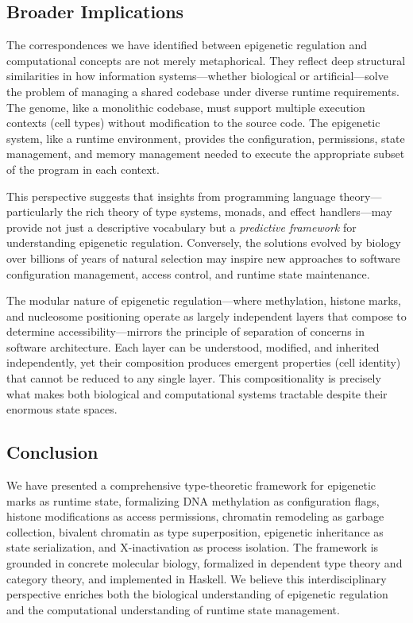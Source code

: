 \documentclass[12pt,a4paper]{article}
\begin{document}
\subsection{Broader Implications}

The correspondences we have identified between epigenetic regulation and computational concepts are not merely metaphorical. They reflect deep structural similarities in how information systems---whether biological or artificial---solve the problem of managing a shared codebase under diverse runtime requirements. The genome, like a monolithic codebase, must support multiple execution contexts (cell types) without modification to the source code. The epigenetic system, like a runtime environment, provides the configuration, permissions, state management, and memory management needed to execute the appropriate subset of the program in each context.

This perspective suggests that insights from programming language theory---particularly the rich theory of type systems, monads, and effect handlers---may provide not just a descriptive vocabulary but a \emph{predictive framework} for understanding epigenetic regulation. Conversely, the solutions evolved by biology over billions of years of natural selection may inspire new approaches to software configuration management, access control, and runtime state maintenance.

The modular nature of epigenetic regulation---where methylation, histone marks, and nucleosome positioning operate as largely independent layers that compose to determine accessibility---mirrors the principle of separation of concerns in software architecture. Each layer can be understood, modified, and inherited independently, yet their composition produces emergent properties (cell identity) that cannot be reduced to any single layer. This compositionality is precisely what makes both biological and computational systems tractable despite their enormous state spaces.

\subsection{Conclusion}

We have presented a comprehensive type-theoretic framework for epigenetic marks as runtime state, formalizing DNA methylation as configuration flags, histone modifications as access permissions, chromatin remodeling as garbage collection, bivalent chromatin as type superposition, epigenetic inheritance as state serialization, and X-inactivation as process isolation. The framework is grounded in concrete molecular biology, formalized in dependent type theory and category theory, and implemented in Haskell. We believe this interdisciplinary perspective enriches both the biological understanding of epigenetic regulation and the computational understanding of runtime state management.
\end{document}
